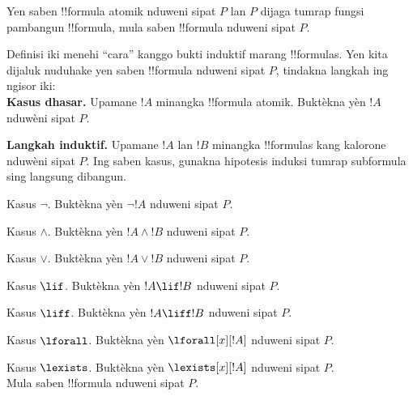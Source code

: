 \documentclass[../../../include/open-logic-section]{subfiles}
\begin{document}
\begin{defn}
Yen saben !!{formula} atomik nduweni sipat $P$ lan $P$ dijaga
tumrap fungsi pambangun !!{formula}, mula saben !!{formula}
nduweni sipat $P$.
\end{defn}

\begin{explain}
Definisi iki menehi ``cara'' kanggo bukti induktif marang
!!{formula}s. Yen kita dijaluk nuduhake yen saben !!{formula}
nduweni sipat $P$, tindakna langkah ing ngisor iki:\\

\textbf{Kasus dhasar.} Upamane $!A$ minangka !!{formula} atomik.
Buktèkna yèn $!A$ nduwèni sipat $P$.

\textbf{Langkah induktif.} Upamane $!A$ lan $!B$ minangka
!!{formula}s kang kalorone nduwèni sipat $P$. Ing saben kasus,
gunakna hipotesis induksi tumrap subformula sing langsung dibangun.

Kasus $\lnot$. Buktèkna yèn $\lnot !A$ nduweni sipat $P$.

Kasus $\land$. Buktèkna yèn $!A \land !B$ nduweni sipat $P$.

Kasus $\lor$. Buktèkna yèn $!A \lor !B$ nduweni sipat $P$.

Kasus $\lif$. Buktèkna yèn $!A \lif !B$ nduweni sipat $P$.

Kasus $\liff$. Buktèkna yèn $!A \liff !B$ nduweni sipat $P$.

Kasus $\lforall$. Buktèkna yèn $\lforall[x][!A]$ nduweni sipat $P$.

Kasus $\lexists$. Buktèkna yèn $\lexists[x][!A]$ nduweni sipat $P$. \\

Mula saben !!{formula} nduweni sipat $P$.
\end{explain}
\end{document}
